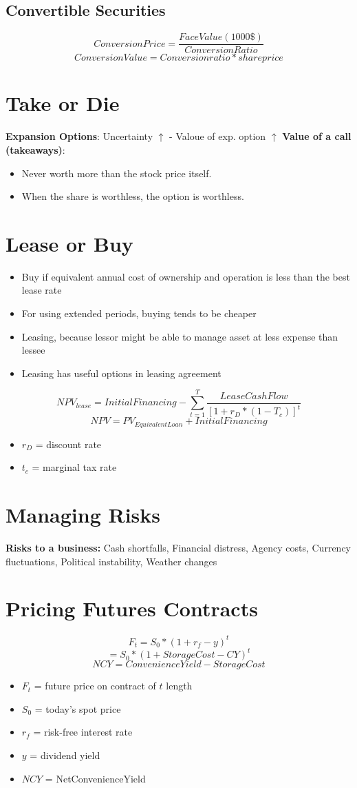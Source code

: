 \documentclass{cheatsheet}
\begin{document}
\subsection{Convertible Securities}
\[Conversion Price = \frac{Face Value (1000\$)}{Conversion Ratio}\]
\[Conversion Value = Conversion ratio * share price\]
\section{Take or Die}
\textbf{Expansion Options}: Uncertainty $\uparrow$ - Valoue of exp. option $\uparrow$
\textbf{Value of a call (takeaways)}: 
\begin{itemize}
  \item Never worth more than the stock price itself.
  \item When the share is worthless, the option is worthless.
\end{itemize}
\section*{Lease or Buy}
\begin{itemize}
  \item Buy if equivalent annual cost of ownership and operation is less than the best lease rate
  \item For using extended periods, buying tends to be cheaper
  \item Leasing, because lessor might be able to manage asset at less expense than lessee
  \item Leasing has useful options in leasing agreement
\end{itemize}
\[NPV_{lease} = InitialFinancing - \sum_{t=1}^{T}\frac{LeaseCashFlow}{[1 + r_D * (1-T_c)]^t}\]
\[NPV = PV_{EquivalentLoan} + InitialFinancing\]
\begin{itemize}
  \item $r_D$ = discount rate
  \item $t_c$ = marginal tax rate
\end{itemize}
\section*{Managing Risks}
\textbf{Risks to a business:} Cash shortfalls, Financial distress, Agency costs, Currency fluctuations, Political instability, Weather changes
\section*{Pricing Futures Contracts}
\[F_t = S_0 * (1 + r_f - y)^t \]
\[= S_0 * (1 + StorageCost - CY)^t\]
\[NCY = ConvenienceYield - StorageCost\]
\begin{itemize}
  \item $F_t$ = future price on contract of $t$ length
  \item $S_0$ = today's spot price
  \item $r_f$ = risk-free interest rate
  \item $y$ = dividend yield 
  \item $NCY$ = NetConvenienceYield
\end{itemize}
\end{document}

